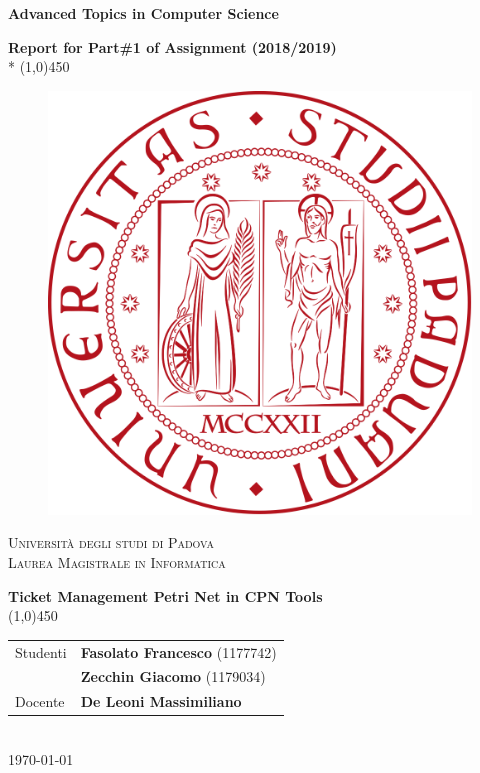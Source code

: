 \documentclass[a4paper,12pt]{article}
\begin{document}

	\begin{titlepage}
		\centering
		\vspace{7cm}
		{\huge\bfseries Advanced Topics in Computer Science\par}
		\vspace*{0,5cm}
		{\Large\bfseries Report for Part\#1 of Assignment (2018/2019)} \\*
		\line(1,0){450} \\
		\vspace*{2cm}
		\begin{figure}[h!]
		    \centering
		    \includegraphics[scale=0.20]{figures/unipd_logo.png}
		    \label{fig:unipd_logo}
		\end{figure}
		{\scshape\Large Università degli studi di Padova\\ \large Laurea Magistrale in Informatica \par}
		\vspace{2cm}
		{\LARGE\bfseries Ticket Management Petri Net in CPN Tools}\\
		\line(1,0){450}\\
		\vspace{1cm}
		\begin{tabular}{l|l}
			 Studenti  & \textbf{Fasolato Francesco} (1177742)\\ & \textbf{Zecchin Giacomo} (1179034) \\
			 Docente    & \textbf{De Leoni Massimiliano} \\
		\end{tabular}\\
		\vspace*{3,5cm}
        \today
	\end{titlepage}
\end{document}
